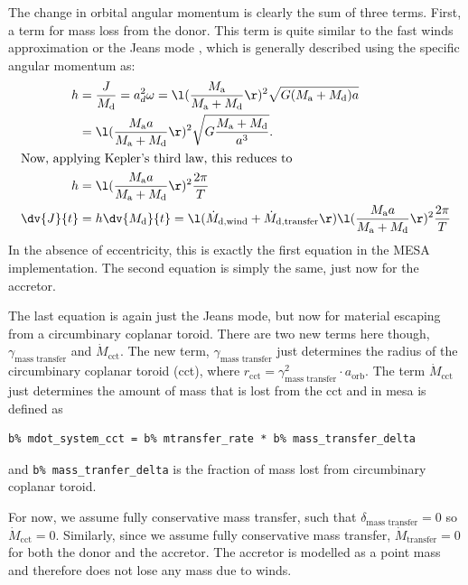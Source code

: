\documentclass[a4paper,10pt]{article}
\begin{document}
The change in orbital angular momentum is clearly the sum of three terms. First, a term for mass loss from the donor. This term is quite similar to the fast winds approximation or the Jeans mode \citep{jeans1924}, which is generally described using the specific angular momentum as:
\begin{align*}
    h &= \frac{J}{M_\text{d}} = a^{2}_{d}\omega = \l(\frac{M_\text{a}}{M_\text{a} + M_\text{d}} \r)^{2} \sqrt{G (M_\text{a} + M_\text{d})a}\\
      &= \l(\frac{M_\text{a}a}{M_\text{a} + M_\text{d}} \r)^{2} \sqrt{G \frac{M_\text{a} + M_\text{d}}{a^{3}}}.\\
    \intertext{Now, applying Kepler's third law, this reduces to}
    h &= \l(\frac{M_\text{a}a}{M_\text{a} + M_\text{d}} \r)^{2} \frac{2\pi}{T}\\ 
\dv{J}{t} &= h \dv{M_\text{d}}{t} = \l(\dot{M}_\text{d,wind} + \dot{M}_\text{d,transfer}\r)\l(\frac{M_\text{a}a}{M_\text{a} + M_\text{d}} \r)^{2} \frac{2\pi}{T} 
\end{align*}
In the absence of eccentricity, this is exactly the first equation in the MESA implementation. The second equation is simply the same, just now for the accretor.

The last equation is again just the Jeans mode, but now for material escaping from a circumbinary coplanar toroid. There are two new terms here though, \(\gamma_\text{mass transfer}\) and \(\dot{M}_\text{cct}\). The new term, \(\gamma_\text{mass transfer}\) just determines the radius of the circumbinary coplanar toroid (cct), where \(r_\text{cct} = \gamma_\text{mass transfer}^{2}  \cdot a_\text{orb}\). The term \(\dot{M}_\text{cct}\) just determines the amount of mass that is lost from the cct and in mesa is defined as
\begin{verbatim}
b% mdot_system_cct = b% mtransfer_rate * b% mass_transfer_delta
\end{verbatim}
and \lstinline[style=output, breaklines=true]|b% mass_tranfer_delta| is the fraction of mass lost from circumbinary coplanar toroid.

For now, we assume fully conservative mass transfer, such that \(\delta_\text{mass transfer} = 0\) so \(\dot{M}_\text{cct}= 0\). Similarly, since we assume fully conservative mass transfer, \(\dot{M}_\text{transfer} = 0 \) for both the donor and the accretor. The accretor is modelled as a point mass and therefore does not lose any mass due to winds.
\end{document}
